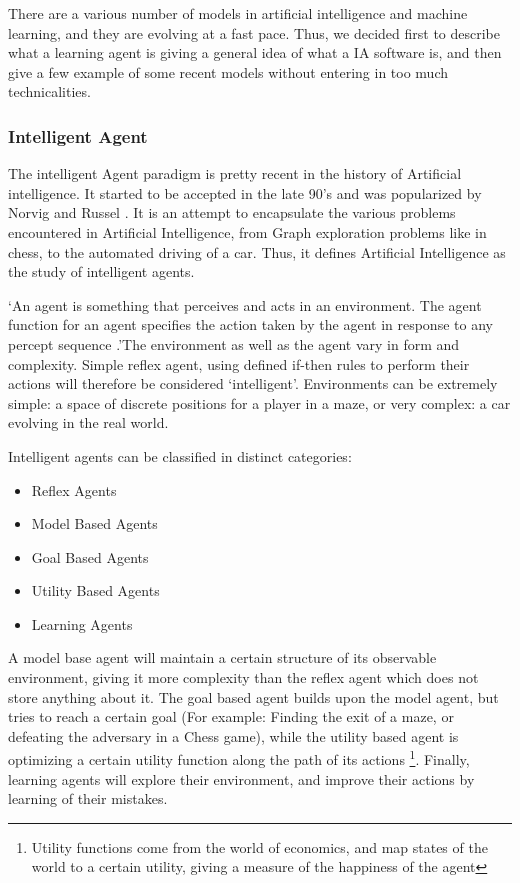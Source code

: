 \documentclass[12pt]{article}
\begin{document}
There are a various number of models in artificial intelligence and machine learning,
and they are evolving at a fast pace. Thus, we decided first to describe what a learning
agent is giving a general idea of what a IA software is, and then give a few
example of some recent models without entering in too much technicalities.

\subsubsection{Intelligent Agent}

The intelligent Agent paradigm is pretty recent in the history of Artificial
intelligence. It started to be accepted in the late 90's and was popularized by
Norvig and Russel \cite{RusselAI}. It is an attempt to encapsulate the various
problems encountered in Artificial Intelligence, from Graph exploration problems
like in chess, to the automated driving of a car. Thus, it defines Artificial
Intelligence as the study of intelligent agents.

 \lq An agent is something that perceives and acts in an environment. The agent
function for an agent specifies the action taken by the agent in response to
any percept sequence \cite{RusselAI} .\rq The environment as well as the agent
vary in form and complexity. Simple reflex agent, using defined if-then rules to
perform their actions will therefore be considered \lq intelligent\rq. Environments
can be extremely simple: a space of discrete positions for a player in a maze,
or very complex: a car evolving in the real world.

Intelligent agents can be classified in distinct categories:

\begin{itemize}
  \item Reflex Agents
  \item Model Based Agents
  \item Goal Based Agents
  \item Utility Based Agents
  \item Learning Agents
\end{itemize}

A model base agent will maintain a certain structure of its observable
environment, giving it more complexity than the reflex agent which does not
store anything about it. The goal based agent builds upon the model agent, but
tries to reach a certain goal (For example: Finding the exit of a maze, or
defeating the adversary in a Chess game), while the utility based agent is
optimizing a certain utility function along the path of its actions
\footnote{Utility functions come from the world of economics, and map states of
the world to a certain utility, giving a measure of the happiness of the agent}.
Finally, learning agents will explore their environment, and improve their
actions  by learning of their mistakes.
\end{document}
